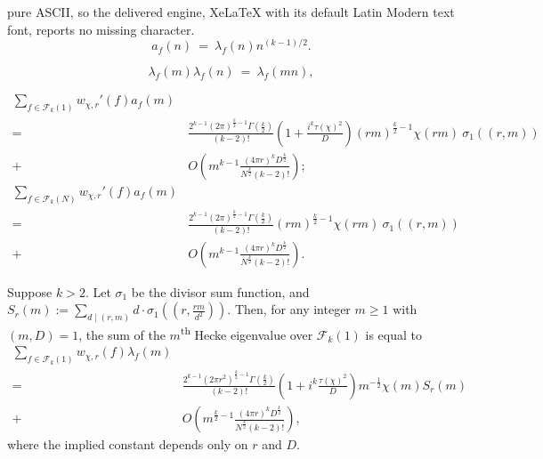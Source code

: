\documentclass[10pt,a4paper]{amsart}
\begin{document}
pure ASCII, so the delivered engine, XeLaTeX with its default Latin Modern text font, reports no missing character.
\begin{equation}\label{eq:Fourier-Hecke}
    a_f(n) \ = \ \lambda_f(n)n^{(k-1)/2}.
\end{equation}

\begin{equation}\label{eq:mult-prop}
\lambda_f(m)\lambda_f(n) \ = \ \lambda_f(mn),
\end{equation}

\begin{align}\nonumber
\sum_{f\in\mathcal{F}_k(1)}w_{\chi,r}'(f)a_f(m)& \\
\nonumber 
= \ & \frac{2^{k-1}(2\pi)^{\frac{k}{2}-1}\Gamma\left(\frac{k}{2}\right)}{(k-2)!}\left(1+\frac{i^k\tau(\chi)^2}{D}\right)(rm)^{\frac{k}{2}-1}\chi(rm) \ \sigma_1((r,m))\\
\label{eq:KR-trace-1.1}
+ \ & O\left(m^{k-1}\frac{(4\pi r)^{k}D^{\frac{k}{2}}}{N^{\frac{k}{2}}(k-2)!}\right); \\
\nonumber
\sum_{f\in\mathcal{F}_k(N)}w_{\chi,r}'(f)a_f(m)& \\
\nonumber 
= \ & \frac{2^{k-1}(2\pi)^{\frac{k}{2}-1}\Gamma\left(\frac{k}{2}\right)}{(k-2)!}(rm)^{\frac{k}{2}-1}\chi(rm) \ \sigma_1((r,m))\\
\label{eq:KR-trace-2.1}
+ \ & O\left(m^{k-1}\frac{(4\pi r)^{k}D^{\frac{k}{2}}}{N^{\frac{k}{2}}(k-2)!}\right).
\end{align}

\begin{lemma}\label{lemma:1}
Suppose $k>2$. Let $\sigma_1$ be the divisor sum function, and $S_r(m) := \sum_{d \mid (r,m)}d \cdot \sigma_1\left(\left(r,\frac{rm}{d^2}\right)\right)$. Then, for any integer $m\geq1$ with $(m,D) = 1$, the sum of the $m$\textsuperscript{th} Hecke eigenvalue over $\mathcal{F}_k(1)$ is equal to
\begin{align}\nonumber
\sum_{f\in\mathcal{F}_k(1)}w_{\chi,r}(f)\lambda_f(m) & \\
\nonumber
= \ & \frac{2^{k-1}(2\pi r^2)^{\frac{k}{2}-1}\Gamma\left(\frac{k}{2}\right)}{(k-2)!}\left(1+i^k\frac{\tau(\chi)^2}{D}\right) m^{-\frac{1}{2}} \chi(m)  S_r(m)\\
\label{eq:sum-1}
+ \ & O\left(m^{\frac{k}{2}-1}\frac{(4\pi r)^{k}D^{\frac{k}{2}}}{N^{\frac{k}{2}}(k-2)!}\right),
\end{align}
where the implied constant depends only on $r$ and $D$. 
\end{lemma}
\end{document}
